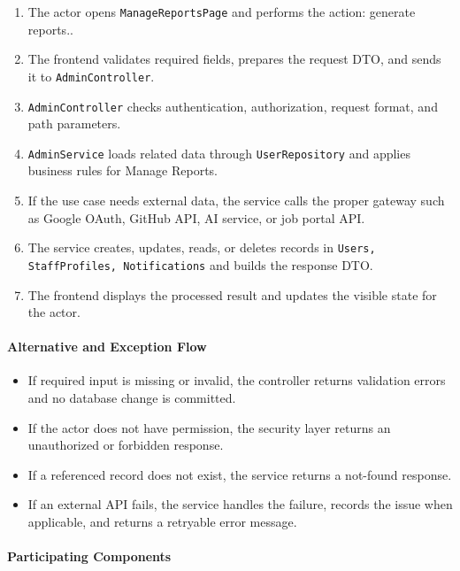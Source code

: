 \begin{enumerate}
    \item The actor opens \texttt{ManageReportsPage} and performs the action: generate reports..
    \item The frontend validates required fields, prepares the request DTO, and sends it to \texttt{AdminController}.
    \item \texttt{AdminController} checks authentication, authorization, request format, and path parameters.
    \item \texttt{AdminService} loads related data through \texttt{UserRepository} and applies business rules for Manage Reports.
    \item If the use case needs external data, the service calls the proper gateway such as Google OAuth, GitHub API, AI service, or job portal API.
    \item The service creates, updates, reads, or deletes records in \texttt{Users, StaffProfiles, Notifications} and builds the response DTO.
    \item The frontend displays the processed result and updates the visible state for the actor.
\end{enumerate}

\paragraph{Alternative and Exception Flow}

\begin{itemize}
    \item If required input is missing or invalid, the controller returns validation errors and no database change is committed.
    \item If the actor does not have permission, the security layer returns an unauthorized or forbidden response.
    \item If a referenced record does not exist, the service returns a not-found response.
    \item If an external API fails, the service handles the failure, records the issue when applicable, and returns a retryable error message.
\end{itemize}

\paragraph{Participating Components}

